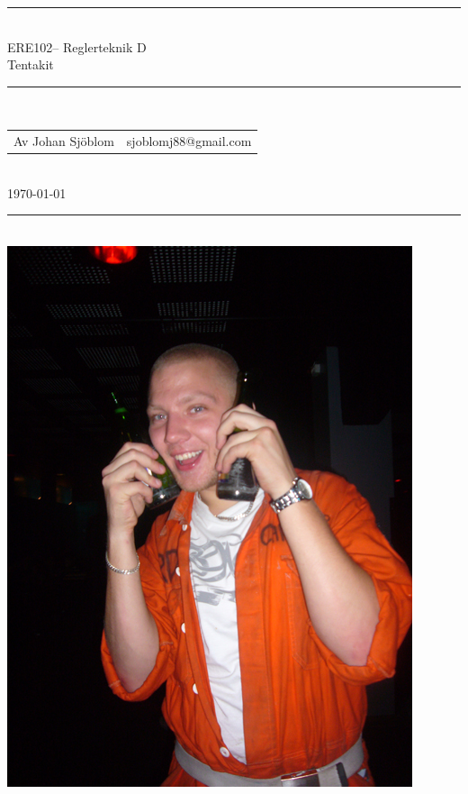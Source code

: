 \documentclass[a4paper]{article}
\newcommand{\coursecode}{ERE102}
\newcommand{\coursename}{Reglerteknik D}
\newcommand{\doctitle}{Tentakit}
\newcommand{\horrule}[1]{\rule{\linewidth}{#1}} %
\begin{document}
\thispagestyle{plain} %


\begin{center}
\horrule{2pt} \\[0.3cm] %
%
\huge  \coursecode -- \coursename \\[1mm]
\Large \doctitle
\normalsize %
\\[5mm]

\horrule{0.5pt}\\[5mm] %

\begin{tabular}{ l r }
  Av Johan Sjöblom & sjoblomj88@gmail.com
\end{tabular}\\[0.1cm]
\footnotesize \today\\[0.4cm]

\end{center}
\horrule{2pt} %
\normalsize %
\\[2.5cm]

\resizebox{!}{120mm}
{\includegraphics{p1110461.jpg}}
\end{document}
